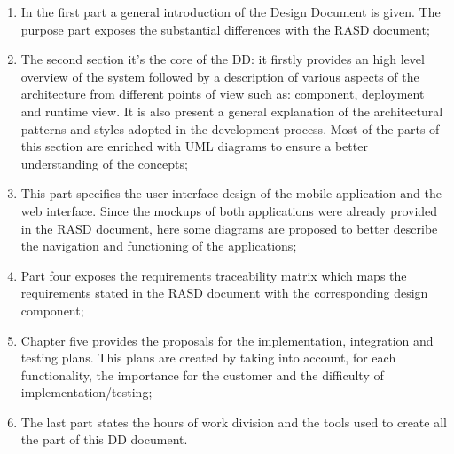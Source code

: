 \begin{enumerate}
  \item In the first part a general introduction of the Design Document is given. The purpose part exposes the substantial differences with the RASD document;
  \item The second section it's the core of the DD: it firstly provides an high level overview of the system followed by  a description of various aspects of the architecture from different points of view such as: component, deployment and runtime view. It is also present a general explanation of the architectural patterns and styles adopted in the development process. Most of the parts of this section are enriched with UML diagrams to ensure a better understanding of the concepts;
  \item This part specifies the user interface design of the mobile application and the web interface. Since the mockups of both applications were already provided in the RASD document, here some diagrams are proposed to better describe the navigation and functioning of the applications;
  \item Part four exposes the requirements traceability matrix which maps the requirements stated in the RASD document with the corresponding design component;
  \item Chapter five provides the proposals for the implementation, integration and testing plans. This plans are created by taking into account, for each functionality, the importance for the customer and the difficulty of implementation/testing;
  \item The last part states the hours of work division and the tools used to create  all the part of this DD document.
\end{enumerate}
